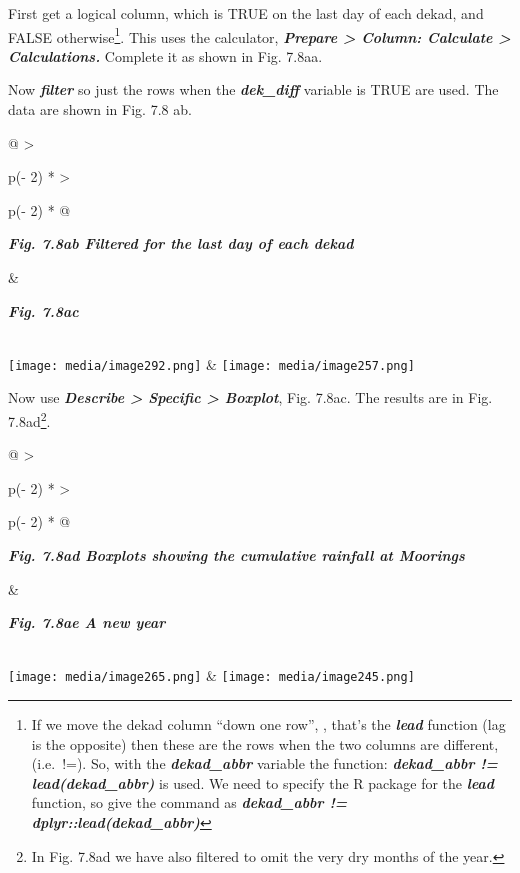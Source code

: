 \documentclass[
  letterpaper,
  DIV=11,
  numbers=noendperiod]{scrreprt}
\begin{document}
First get a logical column, which is TRUE on the last day of each dekad,
and FALSE otherwise\footnote{If we move the dekad column ``down one
  row'', , that's the \textbf{\emph{lead}} function (lag is the
  opposite) then these are the rows when the two columns are different,
  (i.e.~!=). So, with the \textbf{\emph{dekad\_abbr}} variable the
  function: \textbf{\emph{dekad\_abbr != lead(dekad\_abbr)}} is used. We
  need to specify the R package for the \textbf{\emph{lead}} function,
  so give the command as \textbf{\emph{dekad\_abbr !=
  dplyr::lead(dekad\_abbr)}}}. This uses the calculator,
\textbf{\emph{Prepare \textgreater{} Column: Calculate \textgreater{}
Calculations.}} Complete it as shown in Fig. 7.8aa.

Now \textbf{\emph{filter}} so just the rows when the
\textbf{\emph{dek\_diff}} variable is TRUE are used. The data are shown
in Fig. 7.8 ab.

\begin{longtable}[]{@{}
  >{\raggedright\arraybackslash}p{(\columnwidth - 2\tabcolsep) * }
  >{\raggedright\arraybackslash}p{(\columnwidth - 2\tabcolsep) * }@{}}
\toprule\noalign{}
\begin{minipage}[b]{\linewidth}\raggedright
\textbf{\emph{Fig. 7.8ab Filtered for the last day of each dekad}}
\end{minipage} & \begin{minipage}[b]{\linewidth}\raggedright
\textbf{\emph{Fig. 7.8ac}}
\end{minipage} \\
\midrule\noalign{}
\endhead
\bottomrule\noalign{}
\endlastfoot
\texttt{[image: media/image292.png]} &
\texttt{[image: media/image257.png]} \\
\end{longtable}

Now use \textbf{\emph{Describe \textgreater{} Specific \textgreater{}
Boxplot}}, Fig. 7.8ac. The results are in Fig. 7.8ad\footnote{In Fig.
  7.8ad we have also filtered to omit the very dry months of the year.}.

\begin{longtable}[]{@{}
  >{\raggedright\arraybackslash}p{(\columnwidth - 2\tabcolsep) * }
  >{\raggedright\arraybackslash}p{(\columnwidth - 2\tabcolsep) * }@{}}
\toprule\noalign{}
\begin{minipage}[b]{\linewidth}\raggedright
\textbf{\emph{Fig. 7.8ad Boxplots showing the cumulative rainfall at
Moorings}}
\end{minipage} & \begin{minipage}[b]{\linewidth}\raggedright
\textbf{\emph{Fig. 7.8ae A new year}}
\end{minipage} \\
\midrule\noalign{}
\endhead
\bottomrule\noalign{}
\endlastfoot
\texttt{[image: media/image265.png]} &
\texttt{[image: media/image245.png]} \\
\end{longtable}
\end{document}
